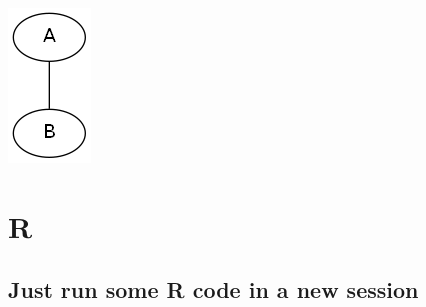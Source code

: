 \documentclass[11pt]{article}
\begin{document}
\begin{center}
\includegraphics[width=.9\linewidth]{dotResult.png}
\end{center}

\section{R}
\label{sec:orgb034b28}

\subsection{Just run some R code in a new session}
\label{sec:org3d6d0ea}
\end{document}
